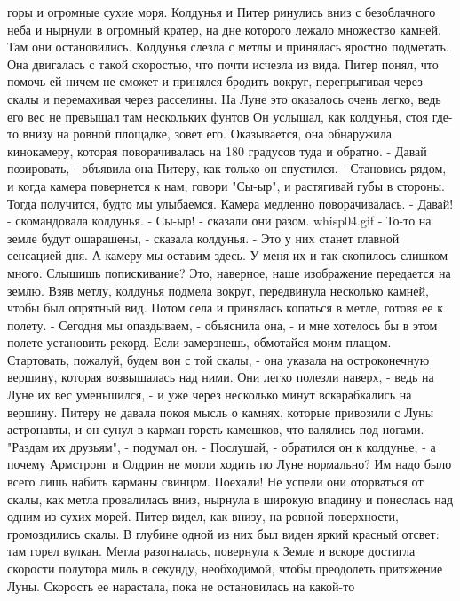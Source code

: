 горы и огромные сухие моря. Колдунья и Питер ринулись вниз с 
безоблачного неба и нырнули в огромный кратер, на дне которого лежало 
множество камней.
    Там они остановились. Колдунья слезла с метлы и принялась яростно 
подметать. Она двигалась с такой скоростью, что почти исчезла из вида. 
Питер понял, что помочь ей ничем не сможет и принялся бродить вокруг, 
перепрыгивая через скалы и перемахивая через расселины. На Луне это 
оказалось очень легко, ведь его вес не превышал там нескольких фунтов
    Он услышал, как колдунья, стоя где-то внизу на ровной площадке, 
зовет его. Оказывается, она обнаружила кинокамеру, которая 
поворачивалась на 180 градусов туда и обратно.
    - Давай позировать, - объявила она Питеру, как только он 
спустился. - Становись рядом, и когда камера повернется к нам, говори 
"Сы-ыр", и растягивай губы в стороны. Тогда получится, будто мы 
улыбаемся.
    Камера медленно поворачивалась.
    - Давай! - скомандовала колдунья.
    - Сы-ыр! - сказали они разом.
    {whisp04.gif}
    - То-то на земле будут ошарашены, - сказала колдунья. - Это у них 
станет главной сенсацией дня. А камеру мы оставим здесь. У меня их и 
так скопилось слишком много. Слышишь попискивание? Это, наверное, наше 
изображение передается на землю.
    Взяв метлу, колдунья подмела вокруг, передвинула несколько камней, 
чтобы был опрятный вид. Потом села и принялась копаться в метле, 
готовя ее к полету.
    - Сегодня мы опаздываем, - объяснила она, - и мне хотелось бы в 
этом полете установить рекорд. Если замерзнешь, обмотайся моим плащом. 
Стартовать, пожалуй, будем вон с той скалы, - она указала на 
остроконечную вершину, которая возвышалась над ними.
    Они легко полезли наверх, - ведь на Луне их вес уменьшился, - и 
уже через несколько минут вскарабкались на вершину. Питеру не давала 
покоя мысль о камнях, которые привозили с Луны астронавты, и он сунул 
в карман горсть камешков, что валялись под ногами. "Раздам их 
друзьям", - подумал он.
    - Послушай, - обратился он к колдунье, - а почему Армстронг и 
Олдрин не могли ходить по Луне нормально? Им надо было всего лишь 
набить карманы свинцом. Поехали!
    Не успели они оторваться от скалы, как метла провалилась вниз, 
нырнула в широкую впадину и понеслась над одним из сухих морей. Питер 
видел, как внизу, на ровной поверхности, громоздились скалы. В глубине 
одной из них был виден яркий красный отсвет: там горел вулкан.
    Метла разогналась, повернула к Земле и вскоре достигла скорости 
полутора миль в секунду, необходимой, чтобы преодолеть притяжение 
Луны. Скорость ее нарастала, пока не остановилась на какой-то 
